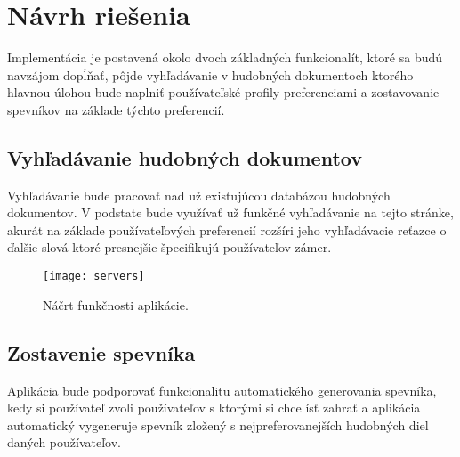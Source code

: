 \newpage

\section{Návrh riešenia}

Implementácia je postavená okolo dvoch základných funkcionalít, ktoré sa budú navzájom dopĺňať, pôjde vyhľadávanie v hudobných dokumentoch ktorého hlavnou úlohou bude naplniť používateľské profily preferenciami a zostavovanie spevníkov na základe týchto preferencií. 

\subsection{Vyhľadávanie hudobných dokumentov}

Vyhľadávanie bude pracovať nad už existujúcou databázou hudobných dokumentov. V podstate bude využívať už funkčné vyhľadávanie na tejto stránke, akurát na základe používateľových preferencií rozšíri jeho vyhľadávacie reťazce o ďalšie slová ktoré presnejšie špecifikujú používateľov zámer.

\begin{figure}\begin{center}\texttt{[image: servers]}
\caption{Náčrt funkčnosti aplikácie.}\label{Náčrt funkčnosti aplikácie}
\end{center}\end{figure}

\subsection{Zostavenie spevníka}

Aplikácia bude podporovať funkcionalitu automatického generovania spevníka, kedy si používateľ zvoli používateľov s ktorými si chce ísť zahrať a aplikácia automatický vygeneruje spevník zložený s nejpreferovanejších hudobných diel daných používateľov.

